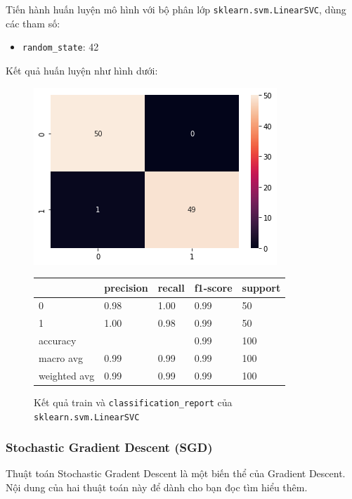 \documentclass[12pt]{article}
\begin{document}
Tiến hành huấn luyện mô hình với bộ phân lớp \texttt{sklearn.svm.LinearSVC}, dùng các tham số:
\begin{itemize}
\item \texttt{random\_state}: 42
\end{itemize}
Kết quả huấn luyện như hình dưới:
\begin{figure}[H]
	\begin{multicols}{2}
		\includegraphics[scale=.5]{img/train-lsvc-result.png}

		\begin{table}[H]
			\begin{tabular}{l l l l l}
				\hline
				& precision & recall & f1-score & support \\
				\hline
				0 & 0.98 & 1.00 & 0.99 & 50 \\
				1 & 1.00 & 0.98 & 0.99 & 50 \\
				accuracy &   &   & 0.99 & 100 \\
				macro avg & 0.99 & 0.99 & 0.99 & 100 \\
				weighted avg & 0.99 & 0.99 & 0.99 & 100 \\
				\hline
			\end{tabular}
		\end{table}
	\end{multicols}
	\caption{Kết quả train và \texttt{classification\_report} của \texttt{sklearn.svm.LinearSVC}}
\end{figure}

\subsubsection{Stochastic Gradient Descent (SGD)}
Thuật toán Stochastic Gradent Descent là một biến thể của Gradient Descent. Nội dung của hai thuật toán này để dành cho bạn đọc tìm hiểu thêm.
\end{document}
